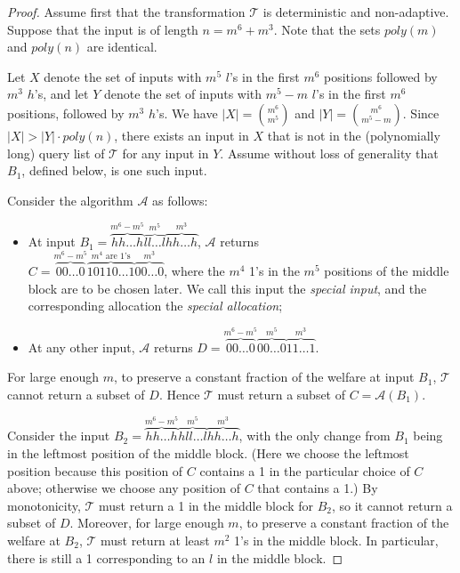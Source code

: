 \documentclass[runningheads,a4paper]{llncs}
\begin{document}
\begin{proof}
Assume first that the transformation $\mathcal{T}$ is deterministic and non-adaptive. Suppose that the input is of length $n=m^6+m^3$. Note that the sets $poly(m)$ and $poly(n)$ are identical. 

Let $X$ denote the set of inputs with $m^5$ $l$'s in the first $m^6$ positions followed by $m^3$ $h$'s, and let $Y$ denote the set of inputs with $m^5-m$ $l$'s in the first $m^6$ positions, followed by $m^3$ $h$'s. We have $|X|=\binom{m^6}{m^5}$ and $|Y|=\binom{m^6}{m^5-m}$. Since $|X|>|Y|\cdot poly(n)$, there exists an input in $X$ that is not in the (polynomially long) query list of $\mathcal{T}$ for any input in $Y$. Assume without loss of generality that $B_1$, defined below, is one such input.

Consider the algorithm $\mathcal{A}$ as follows:
\begin{itemize}
\item At input $B_1=\overbrace{hh\dots h}^{m^6-m^5}\overbrace{ll\dots l}^{m^5}\overbrace{hh\dots h}^{m^3}$, $\mathcal{A}$ returns \\$C=\overbrace{00\dots 0}^{m^6-m^5}\overbrace{10110\dots 1}^{m^4 \text{ are 1's}}\overbrace{00\dots 0}^{m^3}$, where the $m^4$ 1's in the $m^5$ positions of the middle block are to be chosen later. We call this input the \textit{special input}, and the corresponding allocation the \textit{special allocation};

\item At any other input, $\mathcal{A}$ returns $D=\overbrace{00\dots 0}^{m^6-m^5}\overbrace{00\dots 0}^{m^5}\overbrace{11\dots 1}^{m^3}$.
\end{itemize}

For large enough $m$, to preserve a constant fraction of the welfare at input $B_1$, $\mathcal{T}$ cannot return a subset of $D$. Hence $\mathcal{T}$ must return a subset of $C=\mathcal{A}(B_1)$.

Consider the input $B_2=\overbrace{hh\dots h}^{m^6-m^5}\overbrace{hll\dots l}^{m^5}\overbrace{hh\dots h}^{m^3}$, with the only change from $B_1$ being in the leftmost position of the middle block. (Here we choose the leftmost position because this position of $C$ contains a 1 in the particular choice of $C$ above; otherwise we choose any position of $C$ that contains a 1.) By monotonicity, $\mathcal{T}$ must return a 1 in the middle block for $B_2$, so it cannot return a subset of $D$. Moreover, for large enough $m$, to preserve a constant fraction of the welfare at $B_2$, $\mathcal{T}$ must return at least $m^2$ 1's in the middle block. In particular, there is still a 1 corresponding to an $l$ in the middle block. 


\end{proof}
\end{document}

